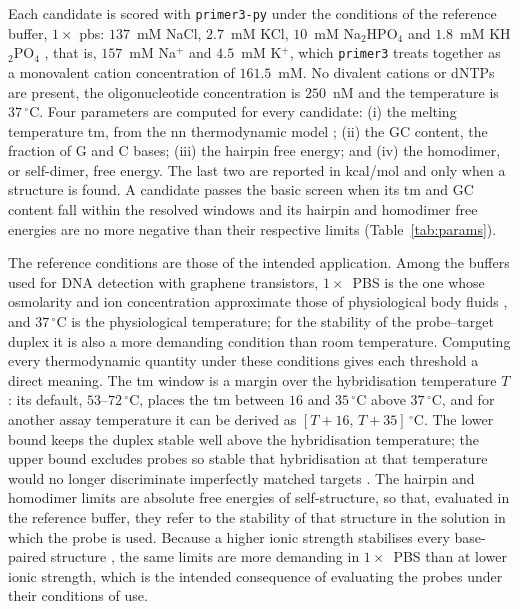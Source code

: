 Each candidate is scored with \texttt{primer3-py} under the conditions of the reference buffer,
$1\times$ \acrfull{pbs}: $137$~mM NaCl, $2.7$~mM KCl, $10$~mM Na$_2$HPO$_4$ and $1.8$~mM KH$_2$PO$_4$
\citep{cshpbs2006}, that is, $157$~mM Na$^+$ and $4.5$~mM K$^+$, which \texttt{primer3} treats together
as a monovalent cation concentration of $161.5$~mM. No divalent cations or dNTPs are present, the
oligonucleotide concentration is $250$~nM and the temperature is $37\,^{\circ}$C. Four parameters are
computed for every candidate: (i) the melting temperature \acrshort{tm}, from the \acrfull{nn}
thermodynamic model \citep{santalucia2004}; (ii) the GC content, the fraction of G and C bases;
(iii) the hairpin free energy; and (iv) the homodimer, or self-dimer, free energy. The last two are
reported in kcal/mol and only when a structure is found. A candidate passes the
basic screen when its \acrshort{tm} and GC content fall within the resolved windows and its hairpin and
homodimer free energies are no more negative than their respective limits (Table~\ref{tab:params}).

The reference conditions are those of the intended application. Among the buffers used for DNA
detection with graphene transistors, $1\times$~PBS is the one whose osmolarity and ion concentration
approximate those of physiological body fluids \citep{purwidyantri2021}, and $37\,^{\circ}$C is the
physiological temperature; for the stability of the probe--target duplex it is also a more demanding
condition than room temperature. Computing every thermodynamic quantity under these conditions gives
each threshold a direct meaning. The \acrshort{tm} window is a margin over the hybridisation temperature
$T$: its default, $53$--$72\,^{\circ}$C, places the \acrshort{tm} between $16$ and $35\,^{\circ}$C above
$37\,^{\circ}$C, and for another assay temperature it can be derived as $[T+16,\,T+35]\,^{\circ}$C. The
lower bound keeps the duplex stable well above the hybridisation temperature; the upper bound excludes
probes so stable that hybridisation at that temperature would no longer discriminate imperfectly
matched targets \citep{wetmur1991}. The hairpin and homodimer limits are absolute free energies of
self-structure, so that, evaluated in the reference buffer, they refer to the stability of that structure
in the solution in which the probe is used. Because a higher ionic strength stabilises every
base-paired structure \citep{santalucia2004}, the same limits are more demanding in $1\times$~PBS than
at lower ionic strength, which is the intended consequence of evaluating the probes under their
conditions of use.

